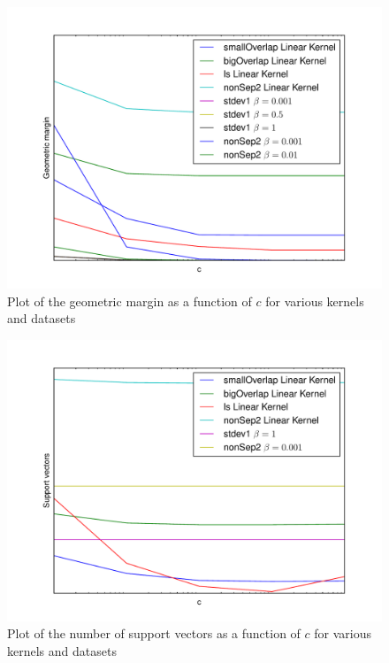 \documentclass[10pt]{article}
\begin{document}
\begin{figure}[!ht]
	\centering
	\includegraphics[width=\textwidth]{1-3-c-margin.pdf}
	\caption{Plot of the geometric margin as a function of $c$ for various kernels and datasets}
	\label{fig:1-3-c-margin}
\end{figure}

\begin{figure}[!ht]
	\centering
	\includegraphics[width=\textwidth]{1-3-support-vectors.pdf}
	\caption{Plot of the number of support vectors as a function of $c$ for various kernels and datasets}
	\label{fig:1-3-support-vectors}
\end{figure}
\end{document}
